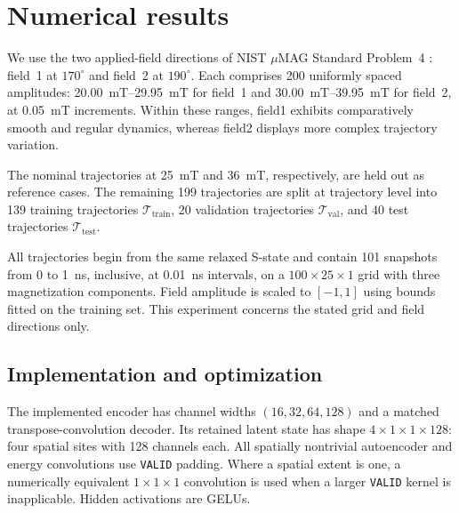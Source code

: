 \documentclass[a4paper,11pt]{article}
\begin{document}
\section{Numerical results}\label{sec:results}
We use the two applied-field directions of NIST $\mu$MAG Standard Problem~4 \cite{nist_sp4}: field~1 at $170^\circ$ and field~2 at $190^\circ$. Each comprises 200 uniformly spaced amplitudes: \SIrange{20.00}{29.95}{mT} for field~1 and \SIrange{30.00}{39.95}{mT} for field~2, at \SI{0.05}{mT} increments. Within these ranges, field1 exhibits comparatively smooth and regular dynamics, whereas field2 displays more complex trajectory variation.

The nominal trajectories at \SI{25}{mT} and \SI{36}{mT}, respectively, are held out as reference cases. The remaining 199 trajectories are split at trajectory level into 139 training trajectories $\mathcal{T}_{\mathrm{train}}$, 20 validation trajectories $\mathcal{T}_{\mathrm{val}}$, and 40 test trajectories $\mathcal{T}_{\mathrm{test}}$.

All trajectories begin from the same relaxed S-state and contain 101 snapshots from 0 to \SI{1}{ns}, inclusive, at \SI{0.01}{ns} intervals, on a $100\times25\times1$ grid with three magnetization components. Field amplitude is scaled to $[-1,1]$ using bounds fitted on the training set. This experiment concerns the stated grid and field directions only.

\subsection{Implementation and optimization}
The implemented encoder has channel widths $(16,32,64,128)$ and a matched transpose-convolution decoder. Its retained latent state has shape $4\times1\times1\times128$: four spatial sites with 128 channels each. All spatially nontrivial autoencoder and energy convolutions use \texttt{VALID} padding. Where a spatial extent is one, a numerically equivalent $1\times1\times1$ convolution is used when a larger \texttt{VALID} kernel is inapplicable. Hidden activations are GELUs.
\end{document}
